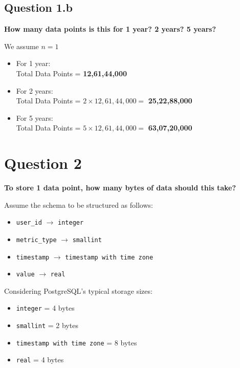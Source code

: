 \documentclass[a4paper, 12pt]{article}
\begin{document}
\subsection*{Question 1.b}
\textbf{How many data points is this for 1 year? 2 years? 5 years?}

\vspace{0.5em}

We assume $n = 1$

\begin{itemize}
    \item For 1 year: \\
    \quad Total Data Points = \textbf{12,61,44,000}
    
    \item For 2 years: \\
    \quad Total Data Points = $2 \times 12,61,44,000 = $ \textbf{25,22,88,000}
    
    \item For 5 years: \\
    \quad Total Data Points = $5 \times 12,61,44,000 = $ \textbf{63,07,20,000}
\end{itemize}

\break

\section*{Question 2}
\textbf{To store 1 data point, how many bytes of data should this take?}

Assume the schema to be structured as follows:

\begin{itemize}
    \item \texttt{user\_id} $\rightarrow$ \texttt{integer}
    \item \texttt{metric\_type} $\rightarrow$ \texttt{smallint}
    \item \texttt{timestamp} $\rightarrow$ \texttt{timestamp with time zone}
    \item \texttt{value} $\rightarrow$ \texttt{real}
\end{itemize}

Considering PostgreSQL's typical storage sizes:

\begin{itemize}
    \item \texttt{integer} = 4 bytes
    \item \texttt{smallint} = 2 bytes
    \item \texttt{timestamp with time zone} = 8 bytes
    \item \texttt{real} = 4 bytes
\end{itemize}
\end{document}
